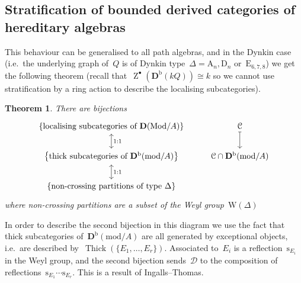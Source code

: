 \documentclass[10pt,a4paper]{article}
\theoremstyle{lecture}
\newtheorem{theorem}{Theorem}
\newcommand\bounded{\ensuremath{\mathrm{b}}}
\newcommand\derived{\ensuremath{\mathbf{D}}}
\newcommand\Mod{\ensuremath{\mathrm{Mod}}}
\DeclareMathOperator\centre{Z}
\DeclareMathOperator\Thick{Thick}
\begin{document}
\subsection{Stratification of bounded derived categories of hereditary algebras}

This behaviour can be generalised to all path algebras, and in the Dynkin case (i.e.\ the underlying graph of~$Q$ is of Dynkin type~$\Delta=\mathrm{A}_n,\mathrm{D}_n$ or~$\mathrm{E}_{6,7,8}$) we get the following theorem (recall that~$\centre^\bullet(\derived^\bounded(kQ))\cong k$ so we cannot use stratification by a ring action to describe the localising subcategories).
\begin{theorem}
  There are bijections
  \begin{equation}
    \begin{tikzcd}
      \left\{ \text{localising subcategories of $\derived(\Mod/A)$} \right\} \arrow[leftrightarrow]{d}{1:1} & \mathcal{C} \arrow[mapsto]{d} \\
      \left\{ \text{thick subcategories of $\derived^\bounded(\mathrm{mod}/A)$} \right\} \arrow[leftrightarrow]{d}{1:1} & \mathcal{C}\cap\derived^\bounded(\mathrm{mod}/A) \\
      \left\{ \text{non-crossing partitions of type~$\Delta$} \right\}
    \end{tikzcd}
  \end{equation}
  where non-crossing partitions are a subset of the Weyl group~$\mathrm{W}(\Delta)$
\end{theorem}

In order to describe the second bijection in this diagram we use the fact that thick subcategories of~$\derived^\bounded(\mathrm{mod}/A)$ are all generated by exceptional objects, i.e.\ are described by~$\Thick(\{E_1,\dotsc,E_r\})$. Associated to~$E_i$ is a reflection~$\mathrm{s}_{E_i}$ in the Weyl group, and the second bijection sends~$\mathcal{D}$ to the composition of reflections~$\mathrm{s}_{E_1}\dotsm\mathrm{s}_{E_r}$. This is a result of Ingalls--Thomas.
\end{document}

